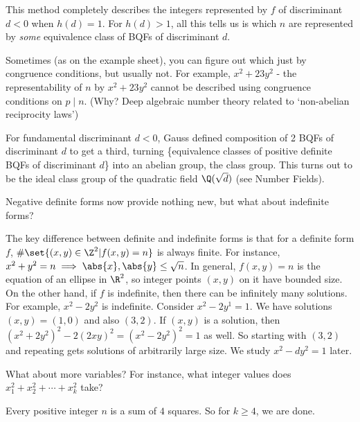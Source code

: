\documentclass{article}
\begin{document}
This method completely describes the integers represented by $f$ of discriminant $d < 0$ when $h(d) = 1$.
For $h(d) > 1$, all this tells us is which $n$ are represented by \emph{some} equivalence class of BQFs of discriminant $d$.

Sometimes (as on the example sheet), you can figure out which just by congruence conditions, but usually not.
For example, $x^2 + 23 y^2$ - the representability of $n$ by $x^2 + 23 y^2$ cannot be described using congruence conditions on $p \mid n$.
(Why? Deep algebraic number theory related to `non-abelian reciprocity laws')

For fundamental discriminant $d < 0$, Gauss defined composition of 2 BQFs of discriminant $d$ to get a third, turning \{equivalence classes of positive definite BQFs of discriminant $d$\} into an abelian group, the class group.
This turns out to be the ideal class group of the quadratic field $\Q(\sqrt{d})$ (see Number Fields).

Negative definite forms now provide nothing new, but what about indefinite forms?

The key difference between definite and indefinite forms is that for a definite form $f$, $\#\set{(x, y) \in \Z^2 | f(x, y) = n}$ is always finite.
For instance, $x^2 + y^2 = n \implies \abs{x}, \abs{y} \leq \sqrt{n}$. In general, $f(x, y) = n$ is the equation of an ellipse in $\R^2$, so integer points $(x, y)$ on it have bounded size.
On the other hand, if $f$ is indefinite, then there can be infinitely many solutions.
For example, $x^2 - 2y^2$ is indefinite. Consider $x^2 - 2y^1 = 1$. We have solutions $(x, y) = (1, 0)$ and also $(3, 2)$. If $(x, y)$ is a solution, then $(x^2 + 2y^2)^2 - 2 (2xy)^2 = (x^2 - 2y^2)^2 = 1$ as well.
So starting with $(3, 2)$ and repeating gets solutions of arbitrarily large size. We study $x^2 - dy^2 = 1$ later.

What about more variables? For instance, what integer values does $x_1^2 + x_2^2 + \dotsb + x_k^2$ take?

\begin{thm}[1770, Lagrange]
    Every positive integer $n$ is a sum of $4$ squares. So for $k \geq 4$, we are done.
\end{thm}
\end{document}
